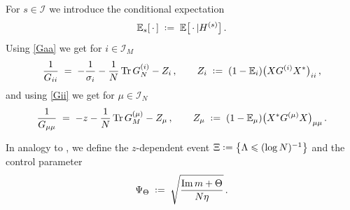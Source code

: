 \documentclass[11pt]{article} %
\numberwithin{equation}{section}
\numberwithin{figure}{section}
\theoremstyle{plain} %
\theoremstyle{definition} %
\renewcommand{\cal}{\mathcal}
\newcommand{\E}{\mathbb{E}}
\newcommand*{\deq}{\mathrel{\vcenter{\baselineskip0.65ex \lineskiplimit0pt \hbox{.}\hbox{.}}}=}
\renewcommand{\leq}{\leqslant}
\newcommand{\pb}[1]{\bigl({#1}\bigr)}
\newcommand{\qb}[1]{\bigl[{#1}\bigr]}
\newcommand{\hb}[1]{\bigl\{{#1}\bigr\}}
\DeclareMathOperator{\tr}{Tr}
\DeclareMathOperator{\im}{Im}
\begin{document}
For $s \in \cal I$ we introduce the conditional expectation
\begin{equation} \label{cond_exp}
\E_s[\,\cdot\,] \;\deq\; \E\qb{ \,\cdot\, \vert H^{(s)}}\,.
\end{equation}
Using \eqref{Gaa} we get for $i \in \cal I_M$
\begin{equation} \label{Gii_exp}
\frac{1}{G_{ii}} \;=\; -\frac{1}{\sigma_i} - \frac{1}{N} \tr G_N^{(i)} - Z_i \,, \qquad Z_i \;\deq\; (1 - \E_i) \pb{X G^{(i)} X^*}_{ii}\,,
\end{equation}
and using \eqref{Gii} we get for $\mu \in \cal I_N$
\begin{equation} \label{Gmumu_exp}
\frac{1}{G_{\mu \mu}} \;=\; - z - \frac{1}{N} \tr G^{(\mu)}_{M} - Z_\mu\,, \qquad Z_\mu \;\deq\; (1 - \E_\mu) \pb{X^* G^{(\mu)} X}_{\mu \mu}\,.
\end{equation}

In analogy to \cite[Section 4]{BEKYY}, we define the $z$-dependent event
$\Xi \deq \hb{\Lambda \leq (\log N)^{-1}}$
and the control parameter
\begin{equation*}
\Psi_\Theta \;\deq\; \sqrt{\frac{\im m + \Theta}{N \eta}}\,.
\end{equation*}
\end{document}
